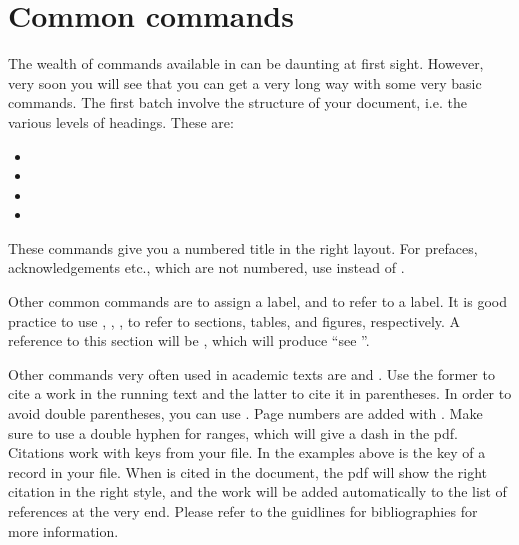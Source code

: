 \section{Common commands}\label{sec:latex:commoncommands}
The wealth of commands available in \latex can be daunting at first sight. However, very soon you will see that you can get a very long way with some very basic commands. The first batch involve the structure of your document, i.e. the various levels of headings. These are:
\begin{itemize}
 \item {}
\item {}
\item {}
\item {}
\end{itemize}

These commands give you a numbered title in the right layout. For prefaces, acknowledgements etc., which are not numbered, use  instead of .
 
Other common commands are 
to assign a label, and 
to refer to a label. It is good practice to use 
,
,
,
to refer to sections, tables, and figures, respectively. A reference to this section will be , which will produce ``see ''.

Other commands very often used in academic texts are  and . Use the former to cite a work in the running text and the latter to cite it in parentheses. In order to avoid double parentheses, you can use  . Page numbers are added with . Make sure to use a double hyphen for ranges, which will give a dash in the pdf. Citations work with keys from your \bibtex file. In the examples above  is the key of a record in your \bibtex file. When  is cited in the document, the pdf will show the right citation in the right style, and the work will be added automatically to the list of references at the very end. Please refer to the guidlines for bibliographies for more information.


